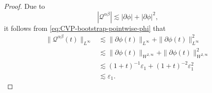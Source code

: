 \documentclass[11pt,twoside]{article}
\def\cQ{\mathcal Q}
\def\ls{\lesssim}
\theoremstyle{plain}
\theoremstyle{definition}
\theoremstyle{assumption}
\numberwithin{equation}{section}
\begin{document}
\begin{proof}
		Due to
		\begin{equation}\label{eq:Chaplygin-Q-pointwise}
			|\cQ^{\alpha\beta}|
			\ls
			|\partial\phi|
			+
			|\partial\phi|^2,
		\end{equation}
		it follows from \eqref{eq:CVP-bootstrap-pointwise-phi} that
		\begin{equation}\label{eq:Chaplygin-Q-Linfty}
			\begin{aligned}
				\|\cQ^{\alpha\beta}(t)\|_{L^\infty}
				&\ls
				\|\partial\phi(t)\|_{L^\infty}
				+
				\|\partial\phi(t)\|_{L^\infty}^2
				\\
				&\ls
				\|\partial\phi(t)\|_{W^{2,\infty}}
				+
				\|\partial\phi(t)\|_{W^{2,\infty}}^2
				\\
				&\ls
				(1+t)^{-1}\varepsilon_1
				+
				(1+t)^{-2}\varepsilon_1^2
				\\
				&\ls
				\varepsilon_1.
			\end{aligned}
		\end{equation}
		

\end{proof}
\end{document}
